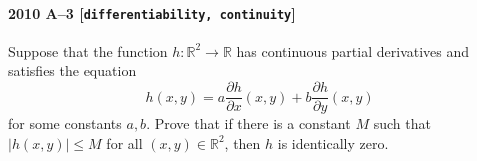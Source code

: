 \paragraph{2010 A--3 \textnormal{[\texttt{differentiability, continuity}]}}
Suppose that the function $h:\mathbb{R}^2\to \mathbb{R}$ has continuous partial
derivatives and satisfies the equation
\[
h(x,y) = a \frac{\partial h}{\partial x}(x,y) +
b \frac{\partial h}{\partial y}(x,y)
\]
for some constants $a,b$. Prove that if there is a constant $M$ such that
$|h(x,y)|\leq M$ for all $(x,y) \in \mathbb{R}^2$, then $h$ is identically zero.
